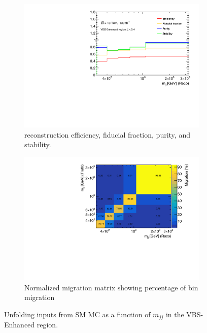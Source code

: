 \begin{figure}[htb]
    \centering
    \begin{subfigure}{.49\textwidth}
        \centering
        \includegraphics[width=.9\linewidth]{figures/Analysis/Unfolding/efficiencies_VBS_Enhanced.pdf}
        \caption{ reconstruction efficiency, fiducial fraction, purity, and stability. \label{fig:UI_mjj} }
    \end{subfigure}
    \begin{subfigure}{.49\textwidth}
        \centering
        \includegraphics[width=.9\linewidth]{figures/Analysis/Unfolding/migration_matrix_VBS_Enhanced.pdf}
        \caption{Normalized migration matrix showing percentage of bin migration \label{fig:MigMatrix}}
    \end{subfigure}
    \caption{ Unfolding inputs from SM MC as a function of $m_{jj}$ in the VBS-Enhanced region. \label{fig:UnfoldingInputs}}
\end{figure}

